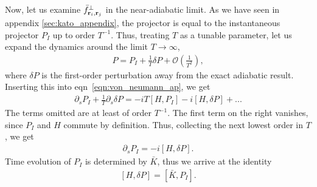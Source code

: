 Now, let us examine $\bar f^\perp_{\textbf r_i, \textbf r_j}$ in the near-adiabatic limit. As we have seen in appendix \ref{sec:kato_appendix}, the projector is equal to the instantaneous projector $P_I$ up to order $T^{-1}$. Thus, treating $T$ as a tunable parameter, let us expand the dynamics around the limit $T \rightarrow \infty$, 
\begin{align}\label{eqn:p_expansion}
    P = P_I + \frac{1}{T}\delta P + \mathcal{O}\left (\frac{1}{T^2}\right ),
\end{align}
where $\delta P$ is the first-order perturbation away from the exact adiabatic result. Inserting this into eqn~\ref{eqn:von_neumann_ap}, we get
\begin{align}
    \partial_s P_I + \frac{1}{T} \partial_{s}\delta P = -iT [H, P_I] -i [H, \delta P] + ...
\end{align}
The terms omitted are at least of order $T^{-1}$. The first term on the right vanishes, since $P_I$ and $H$ commute by definition. Thus, collecting the next lowest order in $T$, we get
\begin{align}
    \partial_s P_I = -i [H, \delta P].
\end{align}
Time evolution of $P_I$ is determined by $\bar K$, thus we arrive at the identity
\begin{align} \label{eqn:HPKP}
    [H, \delta P] = [\bar K, P_I].
\end{align}

